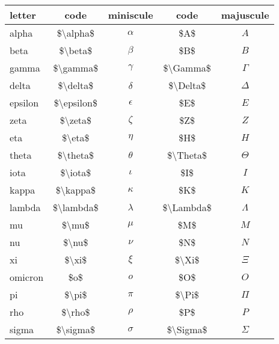\documentclass[10pt, letterpaper, twoside]{article}
\begin{document}
\begin{table}[H]
\begin{flushleft}
\begin{tabular}{lcccc}
\toprule
letter & code & miniscule & code & majuscule \\
\midrule
alpha   & \$\textbackslash alpha\$   & $\alpha$   & \$A\$                      & $A$ \\
beta    & \$\textbackslash beta\$    & $\beta$    & \$B\$                      & $B$ \\
gamma   & \$\textbackslash gamma\$   & $\gamma$   & \$\textbackslash Gamma\$   & $\Gamma$ \\
delta   & \$\textbackslash delta\$   & $\delta$   & \$\textbackslash Delta\$   & $\Delta$ \\
epsilon & \$\textbackslash epsilon\$ & $\epsilon$ & \$E\$                      & $E$ \\
zeta    & \$\textbackslash zeta\$    & $\zeta$    & \$Z\$                      & $Z$ \\
eta     & \$\textbackslash eta\$     & $\eta$     & \$H\$                      & $H$ \\
theta   & \$\textbackslash theta\$   & $\theta$   & \$\textbackslash Theta\$   & $\Theta$ \\
iota    & \$\textbackslash iota\$    & $\iota$    & \$I\$                      & $I$ \\
kappa   & \$\textbackslash kappa\$   & $\kappa$   & \$K\$                      & $K$ \\
lambda  & \$\textbackslash lambda\$  & $\lambda$  & \$\textbackslash Lambda\$  & $\Lambda$ \\
mu      & \$\textbackslash mu\$      & $\mu$      & \$M\$                      & $M$ \\
nu      & \$\textbackslash nu\$      & $\nu$      & \$N\$                      & $N$ \\
xi      & \$\textbackslash xi\$      & $\xi$      & \$\textbackslash Xi\$      & $\Xi$ \\
omicron & \$o\$                      & $o$        & \$O\$                      & $O$ \\
pi      & \$\textbackslash pi\$      & $\pi$      & \$\textbackslash Pi\$      & $\Pi$ \\
rho     & \$\textbackslash rho\$     & $\rho$     & \$P\$                      & $P$ \\
sigma   & \$\textbackslash sigma\$   & $\sigma$   & \$\textbackslash Sigma\$   & $\Sigma$ \\

\end{tabular}
\end{flushleft}
\end{table}
\end{document}
